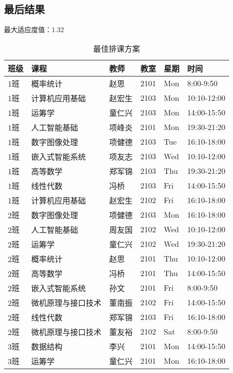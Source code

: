 \documentclass{ctexart}
\begin{document}
	\subsection{最后结果}
	最大适应度值：1.32
	\begin{table}[htbp]
		\centering
		\caption{最佳排课方案}
		\begin{tabular}{|l|l|l|l|l|l|}
		\hline
		\textbf{班级} & \textbf{课程} & \textbf{教师} & \textbf{教室} & \textbf{星期} & \textbf{时间} \\
		\hline
		1班 & 概率统计 & 赵思 & 2101 & Mon & 8:00-9:50 \\
		\hline
		1班 & 计算机应用基础 & 赵宏生 & 2103 & Mon & 10:10-12:00 \\
		\hline
		1班 & 运筹学 & 童仁兴 & 2103 & Mon & 14:00-15:50 \\
		\hline
		1班 & 人工智能基础 & 项峰炎 & 2101 & Mon & 19:30-21:20 \\
		\hline
		1班 & 数字图像处理 & 项健德 & 2103 & Tue & 16:10-18:00 \\
		\hline
		1班 & 嵌入式智能系统 & 项友志 & 2103 & Wed & 10:10-12:00 \\
		\hline
		1班 & 高等数学 & 郑军锦 & 2103 & Thu & 19:30-21:20 \\
		\hline
		1班 & 线性代数 & 冯桥 & 2103 & Fri & 14:00-15:50 \\
		\hline
		1班 & 计算机应用基础 & 赵宏生 & 2102 & Fri & 16:10-18:00 \\
		\hline
		2班 & 数字图像处理 & 项健德 & 2103 & Mon & 16:10-18:00 \\
		\hline
		2班 & 人工智能基础 & 周友国 & 2102 & Wed & 10:10-12:00 \\
		\hline
		2班 & 运筹学 & 童仁兴 & 2102 & Wed & 19:30-21:20 \\
		\hline
		2班 & 概率统计 & 赵思 & 2101 & Thu & 10:10-12:00 \\
		\hline
		2班 & 高等数学 & 冯桥 & 2101 & Thu & 14:00-15:50 \\
		\hline
		2班 & 嵌入式智能系统 & 孙文 & 2101 & Fri & 8:00-9:50 \\
		\hline
		2班 & 微机原理与接口技术 & 董南振 & 2102 & Fri & 14:00-15:50 \\
		\hline
		2班 & 线性代数 & 郑军锦 & 2103 & Fri & 16:10-18:00 \\
		\hline
		2班 & 微机原理与接口技术 & 董友裕 & 2102 & Sat & 8:00-9:50 \\
		\hline
		3班 & 数据结构 & 李兴 & 2101 & Mon & 14:00-15:50 \\
		\hline
		3班 & 运筹学 & 童仁兴 & 2101 & Mon & 16:10-18:00 \\

\end{tabular}
\end{table}
\end{document}
